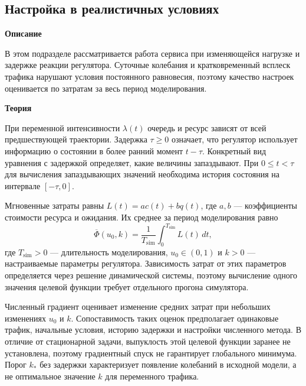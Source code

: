 \documentclass[12pt,a4paper]{article}
\newcommand{\taskhead}[1]{\par\textbf{#1}\par}
\begin{document}
\subsection{Настройка в реалистичных условиях}
\taskhead{Описание}
В этом подразделе рассматривается работа сервиса при изменяющейся нагрузке
и задержке реакции регулятора. Суточные колебания и кратковременный всплеск
трафика нарушают условия постоянного равновесия, поэтому качество настроек
оценивается по затратам за весь период моделирования.
\taskhead{Теория}
При переменной интенсивности $\lambda(t)$ очередь и ресурс зависят от всей
предшествующей траектории. Задержка $\tau\geq0$ означает, что регулятор
использует информацию о состоянии в более ранний момент $t-\tau$.
Конкретный вид уравнения с задержкой определяет, какие величины запаздывают.
При $0\leq t<\tau$ для вычисления запаздывающих значений необходима история
состояния на интервале $[-\tau,0]$.

Мгновенные затраты равны $L(t)=ac(t)+bq(t)$, где $a,b$ --- коэффициенты
стоимости ресурса и ожидания. Их среднее за период моделирования равно
\[
\overline\Phi(u_0,k)=\frac1{T_{\mathrm{sim}}}
\int_0^{T_{\mathrm{sim}}}L(t)\,dt,
\]
где $T_{\mathrm{sim}}>0$ --- длительность моделирования,
$u_0\in(0,1)$ и $k>0$ --- настраиваемые параметры регулятора.
Зависимость затрат от этих параметров определяется через решение
динамической системы, поэтому вычисление одного значения целевой функции
требует отдельного прогона симулятора.

Численный градиент оценивает изменение средних затрат при небольших
изменениях $u_0$ и $k$. Сопоставимость таких оценок предполагает одинаковые
трафик, начальные условия, историю задержки и настройки численного метода.
В отличие от стационарной задачи, выпуклость этой целевой функции заранее
не установлена, поэтому градиентный спуск не гарантирует глобального минимума.
Порог $k_*$ без задержки характеризует появление колебаний в исходной модели,
а не оптимальное значение $k$ для переменного трафика.
\end{document}
